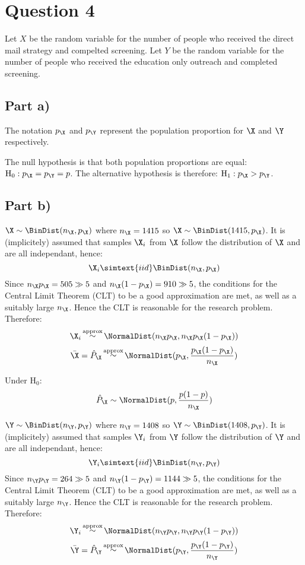 \section{Question 4}

Let $X$ be the random variable for the number of people who received the direct mail strategy and compelted screening.
Let $Y$ be the random variable for the number of people who received the education only outreach and completed screening.

\subsection{Part a)}

The notation $p_\X$ and $p_\Y$ represent the population proportion for $\X$ and $\Y$ respectively.

The null hypothesis is that both population proportions are equal: $\text{H}_0: p_\X = p_\Y = p$. The alternative hypothesis is therefore: $\text{H}_1 : p_\X > p_\Y$.

\subsection{Part b)}

$\X \sim \BinDist (n_\X, p_\X)$ where $n_\X = 1415$ so $\X \sim \BinDist (1415, p_\X)$.
It is (implicitely) assumed that samples $\X_i$ from $\X$ follow the distribution of $\X$ and are all independant, hence:
\[
\X_i \simtext{iid} \BinDist(n_\X, p_\X)
\]
Since $n_\X p_\X = 505 \gg 5$ and $n_\X(1-p_\X)=910 \gg 5$, the conditions for the Central Limit Theorem (CLT) to be a good approximation are met, as well as a suitably large $n_\X$. Hence the CLT is reasonable for the research problem.
Therefore:
\[
\X_i \mathop \sim ^\text{approx} \NormalDist (n_\X p_\X, n_\X p_\X (1 - p_\X))
\]
\[
\bar{\X} = \hat{P}_\X \mathop \sim ^\text{approx} \NormalDist (p_\X, \frac{p_\X (1 - p_\X)}{n_\X})
\]

Under $\text{H}_0$:
\[
\hat{P}_\X \sim \NormalDist (p, \frac{p (1 - p)}{n_\X})
\]


$\Y \sim \BinDist (n_\Y, p_\Y)$ where $n_\Y = 1408$ so $\Y \sim \BinDist (1408, p_\Y)$.
It is (implicitely) assumed that samples $\Y_i$ from $\Y$ follow the distribution of $\Y$ and are all independant, hence:
\[
\Y_i \simtext{iid} \BinDist(n_\Y, p_\Y)
\]
Since $n_\Y p_\Y = 264 \gg 5$ and $n_\Y(1-p_\Y)=1144 \gg 5$, the conditions for the Central Limit Theorem (CLT) to be a good approximation are met, as well as a suitably large $n_\Y$. Hence the CLT is reasonable for the research problem.
Therefore:
\[
\Y_i \mathop \sim ^\text{approx} \NormalDist (n_\Y p_\Y, n_\Y p_\Y (1 - p_\Y))
\]
\[
\bar{\Y} = \hat{P}_\Y \mathop \sim ^\text{approx} \NormalDist (p_\Y, \frac{p_\Y (1 - p_\Y)}{n_\Y})
\]


